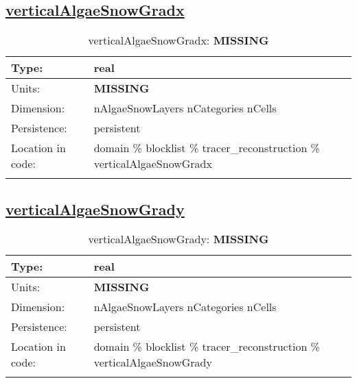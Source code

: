 \subsection[verticalAlgaeSnowGradx]{\hyperref[sec:var_tab_tracer_reconstruction]{verticalAlgaeSnowGradx}}
\label{subsec:var_sec_tracer_reconstruction_verticalAlgaeSnowGradx}
\begin{center}
\begin{longtable}{| p{2.0in} | p{4.0in} |}
        \hline 
        Type: & real \\
        \hline 
        Units: & {\bf \color{red} MISSING} \\
        \hline 
        Dimension: & nAlgaeSnowLayers nCategories nCells \\
        \hline 
        Persistence: & persistent \\
        \hline 
         Location in code: & domain \% blocklist \% tracer\_reconstruction \% verticalAlgaeSnowGradx \\
         \hline 
    \caption{verticalAlgaeSnowGradx: {\bf \color{red} MISSING}}
\end{longtable}
\end{center}
\subsection[verticalAlgaeSnowGrady]{\hyperref[sec:var_tab_tracer_reconstruction]{verticalAlgaeSnowGrady}}
\label{subsec:var_sec_tracer_reconstruction_verticalAlgaeSnowGrady}
\begin{center}
\begin{longtable}{| p{2.0in} | p{4.0in} |}
        \hline 
        Type: & real \\
        \hline 
        Units: & {\bf \color{red} MISSING} \\
        \hline 
        Dimension: & nAlgaeSnowLayers nCategories nCells \\
        \hline 
        Persistence: & persistent \\
        \hline 
         Location in code: & domain \% blocklist \% tracer\_reconstruction \% verticalAlgaeSnowGrady \\
         \hline 
    \caption{verticalAlgaeSnowGrady: {\bf \color{red} MISSING}}
\end{longtable}
\end{center}
